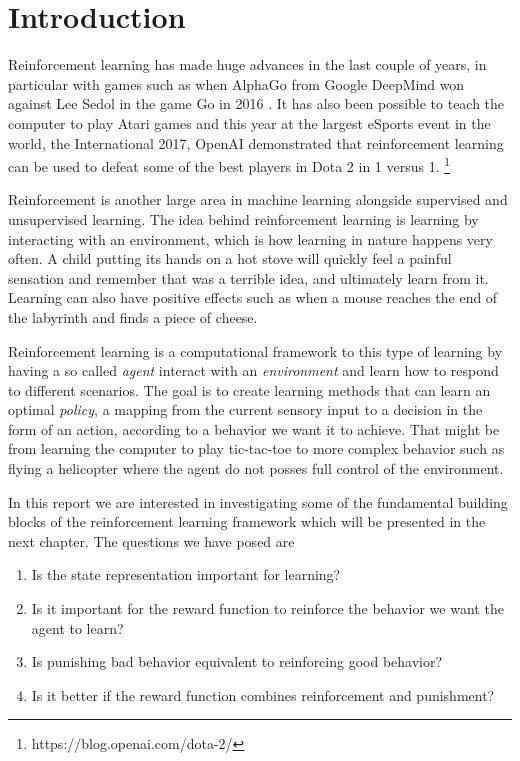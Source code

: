 \documentclass[report.tex]{subfiles}
\begin{document}
    \section*{\centering Introduction}

    Reinforcement learning has made huge advances in the last couple of years, in particular with games such as when AlphaGo from Google DeepMind won against Lee Sedol in the game Go in 2016 \cite{silver2016mastering}. It has also been possible to teach the computer to play Atari games \cite{mnih2013playing} and this year at the largest eSports event in the world, the International 2017, OpenAI demonstrated that reinforcement learning can be used to defeat some of the best players in Dota 2 in 1 versus 1. \footnote{https://blog.openai.com/dota-2/}

    Reinforcement is another large area in machine learning alongside supervised and unsupervised learning. The idea behind reinforcement learning is learning by interacting with an environment, which is how learning in nature happens very often. A child putting its hands on a hot stove will quickly feel a painful sensation and remember that was a terrible idea, and ultimately learn from it. Learning can also have positive effects such as when a mouse reaches the end of the labyrinth and finds a piece of cheese.

    Reinforcement learning is a computational framework to this type of learning by having a so called \textit{agent} interact with an \textit{environment} and learn how to respond to different scenarios. The goal is to create learning methods that can learn an optimal \textit{policy}, a mapping from the current sensory input to a decision in the form of an action, according to a behavior we want it to achieve. That might be from learning the computer to play tic-tac-toe to more complex behavior such as flying a helicopter where the agent do not posses full control of the environment.

    In this report we are interested in investigating some of the fundamental building blocks of the reinforcement learning framework which will be presented in the next chapter. The questions we have posed are

    \begin{enumerate}
        \item Is the state representation important for learning?
        \item Is it important for the reward function to reinforce the behavior we want the agent to learn?
        \item Is punishing bad behavior equivalent to reinforcing good behavior?
        \item Is it better if the reward function combines reinforcement and punishment?
    \end{enumerate}
\end{document}
